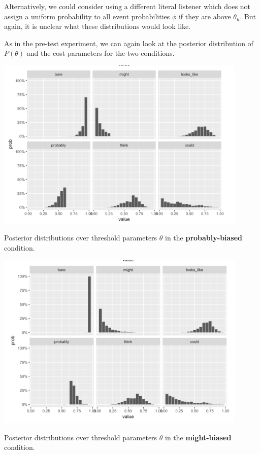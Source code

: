 \documentclass[lucida,biblatex]{sp} %
\begin{document}
Alternatively, we could consider using a different literal listener which does not assign a uniform probability to all event probabilities $\phi$ if they are above $\theta_u$. But again, it is unclear what these distributions would look like.

As in the pre-test experiment, we can again look at the posterior distribution of $P(\theta)$ and the cost parameters for the two conditions.


\begin{center}
\includegraphics[width=0.9\textwidth]{figures/probably-biased-threshold-posterior.png}

Posterior distributions over threshold parameters $\theta$ in the \textbf{probably-biased} condition.
\end{center}

\begin{center}
\includegraphics[width=0.9\textwidth]{figures/might-biased-threshold-posterior.png}

Posterior distributions over threshold parameters $\theta$ in the \textbf{might-biased} condition.
\vspace{2em}
\end{center}
\end{document}

